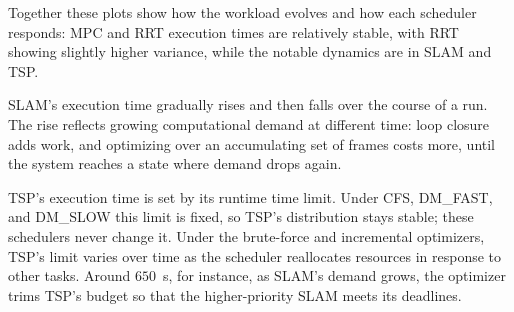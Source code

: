     Together these plots show how the workload evolves and how each scheduler
    responds: MPC and RRT execution times are relatively stable, with RRT showing
    slightly higher variance, while the notable dynamics are in SLAM and TSP.

    SLAM's execution time gradually rises and then falls over the course of a run.
    The rise reflects growing computational demand at different time: loop closure adds work, and
    optimizing over an accumulating set of frames costs more, until the system
    reaches a state where demand drops again.

    TSP's execution time is set by its runtime time limit.
    Under CFS, DM\_FAST, and DM\_SLOW this limit is fixed, so TSP's distribution
    stays stable; these schedulers never change it.
    Under the brute-force and incremental optimizers, TSP's limit varies over time
    as the scheduler reallocates resources in response to other tasks.
    Around $650$~s, for instance, as SLAM's demand grows, the optimizer trims TSP's
    budget so that the higher-priority SLAM meets its deadlines.






